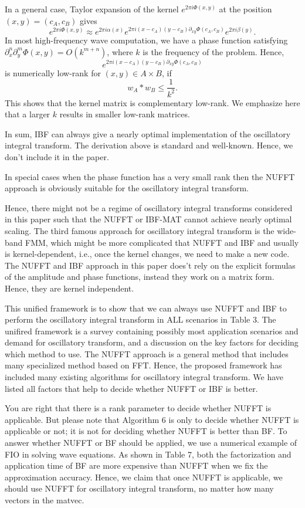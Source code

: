 \documentclass[11pt]{article}
\begin{document}
\begin{enumerate}
{In a general case, Taylor expansion of the kernel $e^{2\pi i\Phi(x,y)}$ at the position $(x,y)=(c_A,c_B)$ gives 
\begin{equation*}
e^{2\pi i\Phi(x,y)}\approx e^{2\pi i \alpha(x)}e^{2\pi i (x-c_A)(y-c_B)\partial_{xy}\Phi(c_A,c_B)}e^{2\pi i \beta(y)}.
\end{equation*}
In most high-frequency wave computation, we have a phase function satisfying $\partial_x^n\partial_y^m \Phi(x,y)=O({k^{m+n}})$, where $k$ is the frequency of the problem. Hence,
\[ 
e^{2\pi i (x-c_A)(y-c_B)\partial_{xy}\Phi(c_A,c_B)}
\]
is numerically low-rank for $(x,y)\in A\times B$, if 
\[
w_A*w_B\leq \frac{1}{k^2}.
\]
This shows that the kernel matrix is complementary low-rank. We emphasize here that a larger $k$ results in smaller low-rank matrices.

In sum, IBF can always give a nearly optimal implementation of the oscillatory integral transform. The derivation above is standard and well-known. Hence, we don't include it in the paper.

In special cases when the phase function has a very small rank then the NUFFT approach is obviously suitable for the oscillatory integral transform.

Hence, there might not be a regime of oscillatory integral transforms considered in this paper such that the NUFFT or IBF-MAT cannot achieve nearly optimal scaling. The third famous approach for oscillatory integral transform is the wide-band FMM, which might be more complicated that NUFFT and IBF and usually is kernel-dependent, i.e., once the kernel changes, we need to make a new code. The NUFFT and IBF approach in this paper does't rely on the explicit formulas of the amplitude and phase functions, instead they work on a matrix form. Hence, they are kernel independent.

This unified framework is to show that we can always use NUFFT and IBF to perform the oscillatory integral transform in ALL scenarios in Table 3. The unifired framework is a survey containing possibly most application scenarios and demand for oscillatory transform, and a discussion on the key factors for deciding which method to use. The NUFFT approach is a general method that includes many specialized method based on FFT. Hence, the proposed framework has included many existing algorithms for oscillatory integral transform. We have listed all factors that help to decide whether NUFFT or IBF is better. 

You are right that there is a rank parameter to decide whether NUFFT is applicable. But please note that Algorithm 6 is only to decide whether NUFFT is applicable or not; it is not for deciding whether NUFFT is better than BF.  To answer whether NUFFT or BF should be applied, we use a numerical example of FIO in solving wave equations. As shown in Table 7, both the factorization and application time of BF are more expensive than NUFFT when we fix the approximation accuracy. Hence, we claim that once NUFFT is applicable, we should use NUFFT for oscillatory integral transform, no matter how many vectors in the matvec.
}


\end{enumerate}
\end{document}
